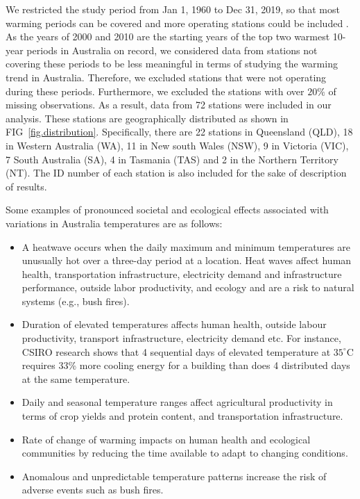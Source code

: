 \documentclass[fleqn,10pt]{wlscirep}
\newcommand{\red}[1]{\textcolor{red}{#1}}
\newcommand{\dc}[1]{#1^{ \circ}\mathrm{C}}
\begin{document}
{We restricted the study period from Jan 1, 1960 to Dec 31, 2019, so that most warming periods can be covered and more operating stations could be included} \cite{gmd-13-5175-2020}. As the years of 2000 and 2010 are the starting years of the top two warmest 10-year periods in Australia on record, we considered data from stations not covering these periods to be less meaningful in terms of studying the warming trend in Australia. Therefore, we excluded stations that were not operating during these periods. Furthermore, we excluded the stations with over $20\%$ of missing observations.  As a result, data from 72 stations were included in our analysis.  These stations are geographically distributed as shown in FIG~\ref{fig.distribution}. Specifically, there are 22 stations in Queensland (QLD), 18 in Western Australia (WA), 11 in New south Wales (NSW), 9 in Victoria (VIC), 7 South Australia (SA), 4 in Tasmania (TAS) and 2 in the Northern Territory (NT). The ID number of each station is also included for the sake of description of results.


Some examples of pronounced societal and ecological effects associated with variations in Australia temperatures are as follows:
\begin{itemize}
	\item  A heatwave occurs when the daily maximum and minimum temperatures are unusually hot over a three-day period at a location. Heat waves affect human health, transportation infrastructure, electricity demand and infrastructure performance, outside labor productivity, and ecology and are a risk to natural systems (e.g., bush fires).
	\item  Duration of elevated temperatures affects human health, outside labour productivity, transport infrastructure, electricity demand etc. For instance, CSIRO research shows that 4 sequential days of elevated temperature at $\dc{35}$ requires 33\% more cooling energy for a building than does 4 distributed days at the same temperature.
	\item  Daily and seasonal temperature ranges affect agricultural productivity in terms of crop yields and protein content, and transportation infrastructure. %
	\item Rate of change of warming impacts on human health and ecological communities by reducing the time available to adapt to changing conditions.
	\item Anomalous and unpredictable temperature patterns increase the risk of adverse events such as bush fires.
\end{itemize}
\end{document}
